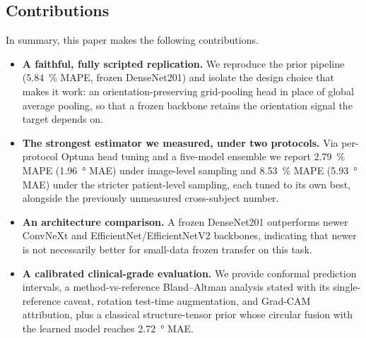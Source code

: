 \subsection{Contributions}
\label{sec:intro:contrib}

In summary, this paper makes the following contributions.
%
\begin{itemize}[leftmargin=1.4em]
  \item \textbf{A faithful, fully scripted replication.} We reproduce the prior
  pipeline (\SI{5.84}{\percent} MAPE, frozen DenseNet201) and isolate the design
  choice that makes it work: an orientation-preserving grid-pooling head in place
  of global average pooling, so that a frozen backbone retains the orientation
  signal the target depends on.
  \item \textbf{The strongest estimator we measured, under two protocols.} Via
  per-protocol Optuna head tuning and a five-model ensemble we report
  \SI{2.79}{\percent} MAPE (\SI{1.96}{\degree} MAE) under image-level sampling and
  \SI{8.53}{\percent} MAPE (\SI{5.93}{\degree} MAE) under the stricter
  patient-level sampling, each tuned to its own best, alongside the previously
  unmeasured cross-subject number.
  \item \textbf{An architecture comparison.} A frozen DenseNet201 outperforms newer
  ConvNeXt and EfficientNet/EfficientNetV2 backbones, indicating that newer is not
  necessarily better for small-data frozen transfer on this task.
  \item \textbf{A calibrated clinical-grade evaluation.} We provide conformal
  prediction intervals, a method-vs-reference Bland--Altman analysis stated with
  its single-reference caveat, rotation test-time augmentation, and Grad-CAM
  attribution, plus a classical structure-tensor prior whose circular fusion with
  the learned model reaches \SI{2.72}{\degree} MAE.
\end{itemize}

